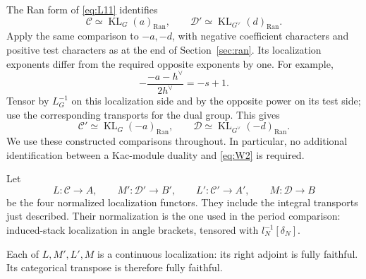 The Ran form of \eqref{eq:L11} identifies
\[
 \mathcal C\simeq\operatorname{KL}_G(a)_{\operatorname{Ran}},\qquad
 \mathcal D'\simeq\operatorname{KL}_{G^\vee}(d)_{\operatorname{Ran}}.
\]
Apply the same comparison to \(-a,-d\), with negative coefficient
characters and positive test characters as at the end of
Section~\ref{sec:ran}.  Its localization exponents differ from the
required opposite exponents by one.  For example,
\[
 -\frac{-a-h^\vee}{2h^\vee}=-s+1.
\]
Tensor by \(L_G^{-1}\) on this localization side and by the opposite
power on its test side; use the corresponding transports for the dual
group.  This gives
\[
 \mathcal C'\simeq\operatorname{KL}_G(-a)_{\operatorname{Ran}},\qquad
 \mathcal D\simeq\operatorname{KL}_{G^\vee}(-d)_{\operatorname{Ran}}.
\]
We use these constructed comparisons throughout.  In particular, no
additional identification between a Kac-module duality and
\eqref{eq:W2} is required.

Let
\[
 L:\mathcal C\longrightarrow A,\qquad
 M':\mathcal D'\longrightarrow B',\qquad
 L':\mathcal C'\longrightarrow A',\qquad
 M:\mathcal D\longrightarrow B
\]
be the four normalized localization functors.  They include the integral
transports just described.  Their normalization is the one used in the
period comparison: induced-stack localization in angle brackets, tensored
with \(l_N^{-1}[\delta_N]\).

\begin{proposition}\label{equivalence:localization}
Each of \(L,M',L',M\) is a continuous localization: its right adjoint is
fully faithful.  Its categorical transpose is therefore fully faithful.
\end{proposition}

